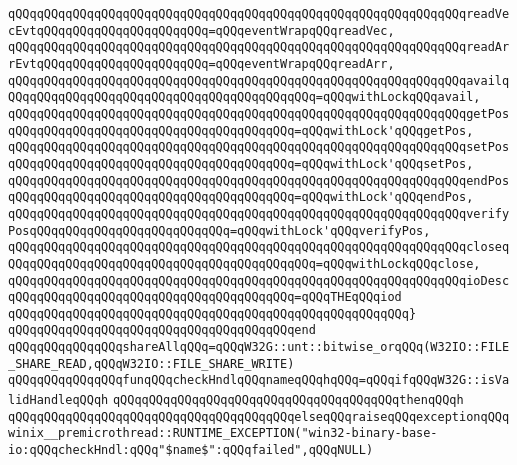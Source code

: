 \verb|qQQqqQQqqQQqqQQqqQQqqQQqqQQqqQQqqQQqqQQqqQQqqQQqqQQqqQQqqQQqqQQqreadVecEvtqQQqqQQqqQQqqQQqqQQqqQQq=qQQqeventWrapqQQqreadVec,|\newline
\verb|qQQqqQQqqQQqqQQqqQQqqQQqqQQqqQQqqQQqqQQqqQQqqQQqqQQqqQQqqQQqqQQqreadArrEvtqQQqqQQqqQQqqQQqqQQqqQQq=qQQqeventWrapqQQqreadArr,|\newline
\verb|qQQqqQQqqQQqqQQqqQQqqQQqqQQqqQQqqQQqqQQqqQQqqQQqqQQqqQQqqQQqqQQqavailqQQqqQQqqQQqqQQqqQQqqQQqqQQqqQQqqQQqqQQqqQQq=qQQqwithLockqQQqavail,|\newline
\verb|qQQqqQQqqQQqqQQqqQQqqQQqqQQqqQQqqQQqqQQqqQQqqQQqqQQqqQQqqQQqqQQqgetPosqQQqqQQqqQQqqQQqqQQqqQQqqQQqqQQqqQQqqQQq=qQQqwithLock'qQQqgetPos,|\newline
\verb|qQQqqQQqqQQqqQQqqQQqqQQqqQQqqQQqqQQqqQQqqQQqqQQqqQQqqQQqqQQqqQQqsetPosqQQqqQQqqQQqqQQqqQQqqQQqqQQqqQQqqQQqqQQq=qQQqwithLock'qQQqsetPos,|\newline
\verb|qQQqqQQqqQQqqQQqqQQqqQQqqQQqqQQqqQQqqQQqqQQqqQQqqQQqqQQqqQQqqQQqendPosqQQqqQQqqQQqqQQqqQQqqQQqqQQqqQQqqQQqqQQq=qQQqwithLock'qQQqendPos,|\newline
\verb|qQQqqQQqqQQqqQQqqQQqqQQqqQQqqQQqqQQqqQQqqQQqqQQqqQQqqQQqqQQqqQQqverifyPosqQQqqQQqqQQqqQQqqQQqqQQqqQQq=qQQqwithLock'qQQqverifyPos,|\newline
\verb|qQQqqQQqqQQqqQQqqQQqqQQqqQQqqQQqqQQqqQQqqQQqqQQqqQQqqQQqqQQqqQQqcloseqQQqqQQqqQQqqQQqqQQqqQQqqQQqqQQqqQQqqQQqqQQq=qQQqwithLockqQQqclose,|\newline
\verb|qQQqqQQqqQQqqQQqqQQqqQQqqQQqqQQqqQQqqQQqqQQqqQQqqQQqqQQqqQQqqQQqioDescqQQqqQQqqQQqqQQqqQQqqQQqqQQqqQQqqQQqqQQq=qQQqTHEqQQqiod|\newline
\verb|qQQqqQQqqQQqqQQqqQQqqQQqqQQqqQQqqQQqqQQqqQQqqQQqqQQqqQQq}|\newline
\verb|qQQqqQQqqQQqqQQqqQQqqQQqqQQqqQQqqQQqqQQqend|\newline
\newline
\newline
\verb|qQQqqQQqqQQqqQQqshareAllqQQq=qQQqW32G::unt::bitwise_orqQQq(W32IO::FILE_SHARE_READ,qQQqW32IO::FILE_SHARE_WRITE)|\newline
\newline
\verb|qQQqqQQqqQQqqQQqfunqQQqcheckHndlqQQqnameqQQqhqQQq=qQQqifqQQqW32G::isValidHandleqQQqh|\newline
\verb|qQQqqQQqqQQqqQQqqQQqqQQqqQQqqQQqqQQqqQQqthenqQQqh|\newline
\verb|qQQqqQQqqQQqqQQqqQQqqQQqqQQqqQQqqQQqqQQqelseqQQqraiseqQQqexceptionqQQqwinix__premicrothread::RUNTIME_EXCEPTION("win32-binary-base-io:qQQqcheckHndl:qQQq"$name$":qQQqfailed",qQQqNULL)|\newline
